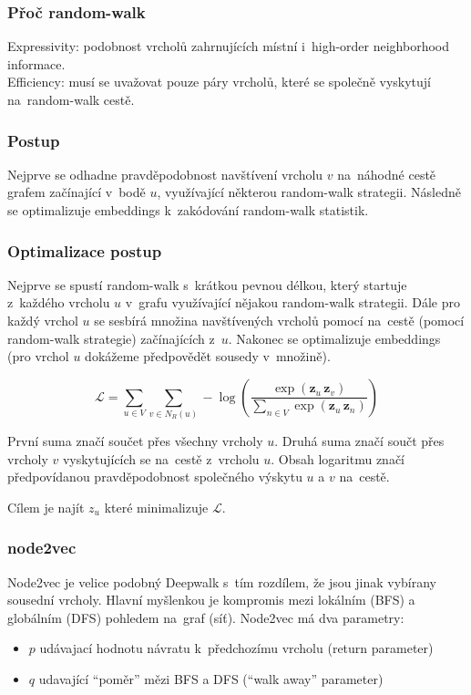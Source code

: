\subsubsection{Přoč random-walk}

{}Expressivity: podobnost vrcholů zahrnujících místní i~high-order neighborhood informace.
\\Efficiency: musí se uvažovat pouze páry vrcholů, které se společně vyskytují na~random-walk cestě.

\subsubsection{Postup}

Nejprve se odhadne pravděpodobnost navštívení vrcholu $v$ na~náhodné cestě grafem začínající v~bodě $u$, využívající některou random-walk strategii. 
Následně se optimalizuje embeddings k~zakódování random-walk statistik.

\subsubsection{Optimalizace postup}

Nejprve se spustí random-walk s~krátkou pevnou délkou, který startuje z~každého vrcholu $u$ v~grafu využívající nějakou random-walk strategii.
Dále pro každý vrchol $u$ se sesbírá množina navštívených vrcholů pomocí na~cestě (pomocí random-walk strategie) začínajících z~$u$.
Nakonec se optimalizuje embeddings (pro vrchol $u$ dokážeme předpovědět sousedy v~množině).

$$\mathcal{L} = \sum_{u\in V} \sum_{v\in N_R (u)} - \log(\frac{\exp(\mathbf{z}_{u}\,\mathbf{z}_{v})}{\sum_{n\in V} \exp(\mathbf{z}_{u}\,\mathbf{z}_{n})})$$

První suma značí součet přes všechny vrcholy $u$.
Druhá suma značí součt přes vrcholy $v$ vyskytujících se na~cestě z~vrcholu $u$.
Obsah logaritmu značí předpovídanou pravděpodobnost společného výskytu $u$ a $v$ na~cestě.

Cílem je najít $z_u$ které minimalizuje $\mathcal{L}$.


\subsubsection{node2vec}

Node2vec je velice podobný Deepwalk s~tím rozdílem, že jsou jinak vybírany sousední vrcholy.
Hlavní myšlenkou je kompromis mezi lokálním (BFS) a globálním (DFS) pohledem na~graf (síť).
Node2vec má dva parametry:
\begin{itemize}
	\item $p$ udávajací hodnotu návratu k~předchozímu vrcholu (return parameter)
	\item $q$ udavající \enquote{poměr} mězi BFS a DFS (\enquote{walk away} parameter)
\end{itemize}

